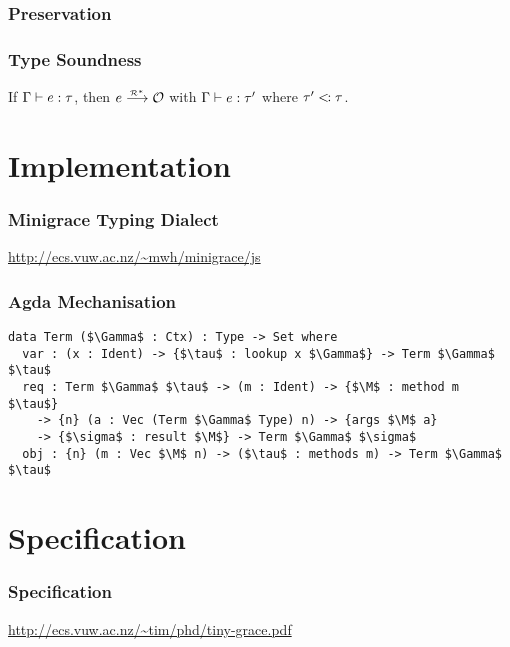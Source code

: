 \documentclass[xcolor=pdftex,x11names]{beamer}
\begin{document}
\begin{frame}
  \frametitle{Preservation}


\end{frame}

\begin{frame}
  \frametitle{Type Soundness}

  \begin{theorem}
    If $\Gamma \vdash e : \tau$, then $e \overset{_{\mathcal{R}^*}}{\longrightarrow} \mathcal{O}$ with $\Gamma \vdash e : \tau^\prime$ where
    $\tau^\prime <\kern-1pt: \tau$.
  \end{theorem}
\end{frame}


\section{Implementation}

\begin{frame}
  \frametitle{Minigrace Typing Dialect}

  \url{http://ecs.vuw.ac.nz/~mwh/minigrace/js}
\end{frame}

\begin{frame}[fragile]
  \frametitle{Agda Mechanisation}

  \begin{lstlisting}[keywords={data,where}]
data Term ($\Gamma$ : Ctx) : Type -> Set where
  var : (x : Ident) -> {$\tau$ : lookup x $\Gamma$} -> Term $\Gamma$ $\tau$
  req : Term $\Gamma$ $\tau$ -> (m : Ident) -> {$\M$ : method m $\tau$}
    -> {n} (a : Vec (Term $\Gamma$ Type) n) -> {args $\M$ a}
    -> {$\sigma$ : result $\M$} -> Term $\Gamma$ $\sigma$
  obj : {n} (m : Vec $\M$ n) -> ($\tau$ : methods m) -> Term $\Gamma$ $\tau$
  \end{lstlisting}
\end{frame}


\section{Specification}

\begin{frame}
  \frametitle{Specification}

  \url{http://ecs.vuw.ac.nz/~tim/phd/tiny-grace.pdf}
\end{frame}
\end{document}
